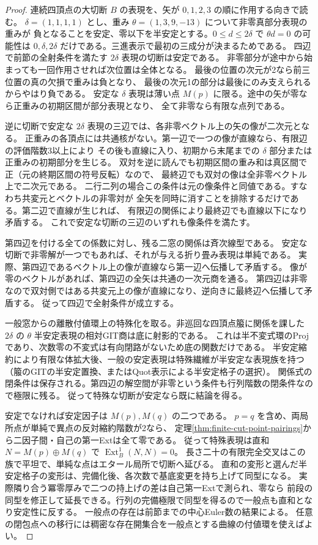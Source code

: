 \begin{proof}
連続四頂点の大切断 $B$ の表現を、矢が $0,1,2,3$ の順に作用する向きで読む。
$\delta=(1,1,1,1)$ とし、重み $\theta=(1,3,9,-13)$ について非零真部分表現の重みが
負となることを安定、零以下を半安定とする。$0\le d\le2\delta$ で
$\theta d=0$ の可能性は $0,\delta,2\delta$ だけである。三進表示で最初の三成分が決まるためである。
四辺で前節の全射条件を満たす $2\delta$ 表現の切断は安定である。
非零部分が途中から始まっても一回作用させれば次位置は全体となる。
最後の位置の次元が2なら前三位置の真の欠損で重みは負となり、
最後の次元1の部分は最後にのみ支えられるからやはり負である。
安定な $\delta$ 表現は薄い点 $M(p)$ に限る。途中の矢が零なら正重みの初期区間が部分表現となり、
全て非零なら有限な点列である。

逆に切断で安定な $2\delta$ 表現の三辺では、各非零ベクトル上の矢の像が二次元となる。
正重みの各頂点には共通核がない。第一辺で一つの像が直線なら、有限辺の評価階数3以上により
その後も直線に入り、初期から末尾までの $\delta$ 部分または正重みの初期部分を生じる。
双対を逆に読んでも初期区間の重み和は真区間で正（元の終期区間の符号反転）なので、
最終辺でも双対の像は全非零ベクトル上で二次元である。
二行二列の場合この条件は元の像条件と同値である。すなわち共変元とベクトルの非零対が
全矢を同時に消すことを排除するだけである。第二辺で直線が生じれば、
有限辺の関係により最終辺でも直線以下になり矛盾する。
これで安定な切断の三辺のいずれも像条件を満たす。

第四辺を付ける全ての係数に対し、残る二窓の関係は斉次線型である。
安定な切断で非零解が一つでもあれば、それが与える折り畳み表現は単純である。
実際、第四辺であるベクトル上の像が直線なら第一辺へ伝播して矛盾する。
像が零のベクトルがあれば、第四辺の全矢は共通の一次元商を通る。
第四辺は非零なので双対側ではある共変元上の像が直線になり、逆向きに最終辺へ伝播して矛盾する。
従って四辺で全射条件が成立する。

一般窓からの離散付値環上の特殊化を取る。非巡回な四頂点箙に関係を課した
$2\delta$ の $\theta$ 半安定表現の相対GIT商は底に射影的である。
これは半不変式環のProjであり、次数零の不変式は有向閉路がないため底の関数だけである。
半安定縮約により有限な体拡大後、一般の安定表現は特殊繊維が半安定な表現族を持つ
（箙のGITの半安定置換、またはQuot表示による半安定格子の選択）。
関係式の閉条件は保存される。第四辺の解空間が非零という条件も行列階数の閉条件なので極限に残る。
従って特殊な切断が安定なら既に結論を得る。

安定でなければ安定因子は $M(p),M(q)$ の二つである。
$p=q$ を含め、両局所点が単純で異点の反対縮約階数が2なら、
定理\ref{thm:finite-cut-point-pairings}から二因子間・自己の第一Extは全て零である。
従って特殊表現は直和 $N=M(p)\oplus M(q)$ で $\operatorname{Ext}^1_B(N,N)=0$。
長さ二十の有限完全交叉はこの族で平坦で、単純な点はエタール局所で切断へ延びる。
直和の変形と選んだ半安定格子の変形は、完備化後、各次数で基底変更を持ち上げて同型になる。
実際隣り合う冪零厚みで二つの持上げの差は自己第一Extで測られ、零なら
前段の同型を修正して延長できる。行列の完備極限で同型を得るので一般点も直和となり安定性に反する。
一般点の存在は前節までの中心Euler数の結果による。
任意の閉包点への移行には稠密な存在開集合を一般点とする曲線の付値環を使えばよい。
\end{proof}


